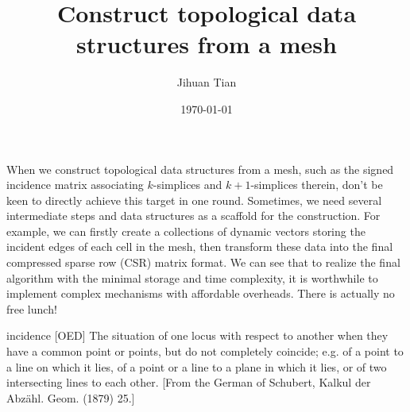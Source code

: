 \documentclass[11pt]{article}
\author{Jihuan Tian}
\date{\today}
\title{Construct topological data structures from a mesh}
\begin{document}
\maketitle
\setcounter{tocdepth}{5}
\tableofcontents

When we construct topological data structures from a mesh, such as the signed incidence matrix associating \(k\)-simplices and \(k+1\)-simplices therein, don't be keen to directly achieve this target in one round. Sometimes, we need several intermediate steps and data structures as a scaffold for the construction. For example, we can firstly create a collections of dynamic vectors storing the incident edges of each cell in the mesh, then transform these data into the final compressed sparse row (CSR) matrix format. We can see that to realize the final algorithm with the minimal storage and time complexity, it is worthwhile to implement complex mechanisms with affordable overheads. There is actually no free lunch!

incidence [OED] The situation of one locus with respect to another when they have a common point or points, but do not completely coincide; e.g. of a point to a line on which it lies, of a point or a line to a plane in which it lies, or of two intersecting lines to each other. [From the German of Schubert, Kalkul der Abzähl. Geom. (1879) 25.]
\end{document}
